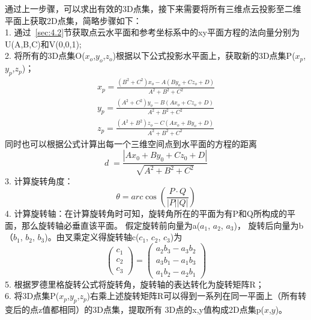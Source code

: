 通过上一步骤，可以求出有效的3D点集，接下来需要将所有三维点云投影至二维平面上获取2D点集，简略步骤如下：\\
1.	通过~\ref{sec:4.2}节获取点云水平面和参考坐标系中的xy平面方程的法向量分别为U(A,B,C)和V(0,0,1);\\
2.	将所有的3D点集O($x_o$,$y_o$,$z_o$)根据以下公式投影水平面上，获取新的3D点集P($x_p$,$y_p$,$z_p$)；
\begin{equation}
  \begin{split}
  x_p=\frac{(B^2+C^2)x_o-A(By_o+Cz_o+D)}{A^2+B^2+C^2}\\
  y_p=\frac{(A^2+C^2)y_o-B(Ax_o+Cz_o+D)}{A^2+B^2+C^2}\\
  z_p=\frac{(A^2+B^2)z_o-C(Ax_o+By_o+D)}{A^2+B^2+C^2}
  \label{equ:pxyz}
  \end{split}
\end{equation}
同时也可以根据公式计算出每一个三维空间点到水平面的方程的距离
\begin{equation}
d\;=\frac{\left|Ax_0+By_0+Cz_0+D\right|}{\sqrt{A^2+B^2+C^2}}
\end{equation}
3.	计算旋转角度：
\begin{equation}
\theta=arc\cos(\frac{P\cdot Q}{\left|P\right|\left|Q\right|})
\end{equation}
4.	计算旋转轴：在计算旋转角时可知，旋转角所在的平面为有P和Q所构成的平面，那么旋转轴必垂直该平面。
假定旋转前向量为a($a_1$, $a_2$, $a_3$)， 旋转后向量为b（$b_1$, $b_2$, $b_3$)。由叉乘定义得旋转轴c($c_1$, $c_2$, $c_3$)为
\begin{equation}
\begin{pmatrix}c_1\\c_2\\c_3\end{pmatrix}=\begin{pmatrix}a_2b_3-a_3b_2\\a_3b_1-a_1b_3\\a_1b_2-a_2b_1\end{pmatrix}
\end{equation}
5.	根据罗德里格旋转公式将旋转角，旋转轴的表达转化为旋转矩阵R；\\
6.	将3D点集P($x_p$,$y_p$,$z_p$)右乘上述旋转矩阵R可以得到一系列在同一平面上（所有转变后的点z值都相同）的3D点集，提取所有
3D点的x,y值构成2D点集p($x$,$y$)。
